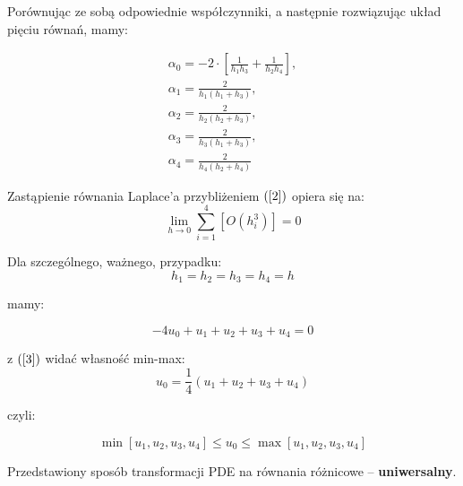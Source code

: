\begin{frame}
  Porównując ze sobą odpowiednie współczynniki, a następnie rozwiązując układ pięciu równań, mamy:
  \begin{block}{}
    $$ \begin{array}{l}
    \alpha_0 = -2 \cdot \left[ \frac{1}{h_1 h_3} + \frac{1}{h_2 h_4} \right], \\
    \alpha_1 = \frac{2}{h_1 (h_1 + h_3)}, \\
    \alpha_2 = \frac{2}{h_2 (h_2 + h_3)}, \\
    \alpha_3 = \frac{2}{h_3 (h_1 + h_3)}, \\
    \alpha_4 = \frac{2}{h_4 (h_2 + h_4)}
    \end{array}$$
  \end{block}

  Zastąpienie równania Laplace'a przybliżeniem $(\ref{2})$ opiera się na:
  $$ \lim_{h \rightarrow 0} \sum_{i=1}^4 [O(h_i^3)] = 0$$
\end{frame}

\begin{frame}
  Dla szczególnego, ważnego, przypadku:
  $$ h_1 = h_2 = h_3 = h_4 = h $$

  mamy:

  \begin{equation} \label{3} -4 u_0 + u_1 + u_2 + u_3 + u_4 = 0 \end{equation}

  z $(\ref{3})$ widać własność min-max:
  $$ u_0 = \frac{1}{4} (u_1 + u_2 + u_3 + u_4) $$

  czyli:
  \begin{block}{}
    $$ \min[u_1, u_2, u_3, u_4] \le u_0 \le \max[u_1, u_2, u_3, u_4] $$
  \end{block}

  Przedstawiony sposób transformacji PDE na równania różnicowe -- \textbf{uniwersalny}.
\end{frame}
